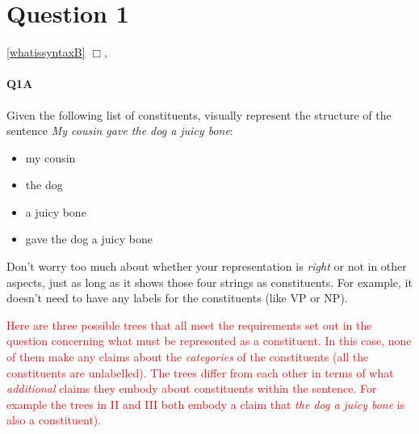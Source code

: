 \documentclass{article}
\begin{document}
\maketitle
\subtitle{Tutorial Notes Week 5: Topics 1, 2 \& 3}

\section*{Question 1}
\hfill{}
\ref{whatissyntaxB} $\Box$, 

\paragraph{Q1A} Given the following list of constituents, visually represent the structure of the sentence \emph{My cousin gave the dog a juicy bone}:
\begin{itemize}
    \item my cousin
    \item the dog
    \item a juicy bone
    \item gave the dog a juicy bone
\end{itemize}
Don’t worry too much about whether your representation is \emph{right} or not in other aspects, just as long as it
shows those four strings as constituents. For example, it doesn't need to have any labels for the constituents (like VP or NP).

\textcolor{red}{Here are three possible trees that all meet the requirements set out in the question concerning what must be represented as a constituent. In this case, none of them make any claims about the \emph{categories} of the constituents (all the constituents are unlabelled). The trees differ from each other in terms of what \emph{additional} claims they embody about constituents within the sentence.  For example the trees in II and III both embody a claim that \emph{the dog a juicy bone} is also a constituent). }


\begin{quote}
\end{quote}
\end{document}
